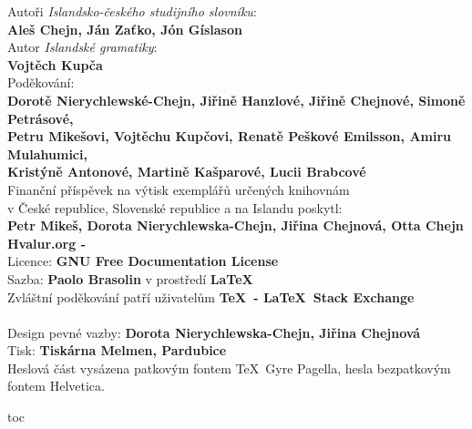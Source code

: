 \clearpage

\noindent\begin{minipage}[t][\textheight][t]{\textwidth}
Autoři \textit{Islandsko-českého studijního slovníku}:\\
  \textbf{Aleš Chejn, Ján Zaťko, Jón Gíslason}\\[\baselineskip]
Autor \textit{Islandské gramatiky}:\\
  \textbf{Vojtěch Kupča}\\[\baselineskip]
Poděkování:\\
  \textbf{Dorotě Nierychlewské-Chejn, Jiřině Hanzlové, Jiřině Chejnové,
          Simoně Petrásové,\\ Petru Mikešovi, Vojtěchu Kupčovi, 
          Renatě Peškové Emilsson, Amiru Mulahumici, \\ Kristýně Antonové, 
          Martině Kašparové, Lucii Brabcové}\\[\baselineskip]
Finanční příspěvek na výtisk exemplářů určených knihovnám\\ v České republice,
Slovenské republice a na Islandu poskytl:\\
  \textbf{Petr Mikeš, Dorota Nierychlewska-Chejn, Jiřina Chejnová, Otta Chejn}
  \\[36\baselineskip]
\textbf{Hvalur.org - \the\year}\\
Licence: \textbf{GNU Free Documentation License}\\
Sazba: \textbf{Paolo Brasolin} v prostředí  \textbf\LaTeX\\
  Zvláštní poděkování patří uživatelům  \textbf{\TeX\ - \LaTeX\ Stack Exchange}\\[\baselineskip]
\textbf\ISBN\\[\baselineskip]
Design pevné vazby: \textbf{Dorota Nierychlewska-Chejn, Jiřina Chejnová}\\
Tisk: \textbf{Tiskárna Melmen, Pardubice}\\
Heslová část vysázena patkovým fontem \TeX\ Gyre Pagella,
hesla bezpatkovým fontem {\phvfamily Helvetica}.
\end{minipage}


\cleardoublepage

\pdfbookmark\contentsname{toc}    

\tableofcontents

\fi



